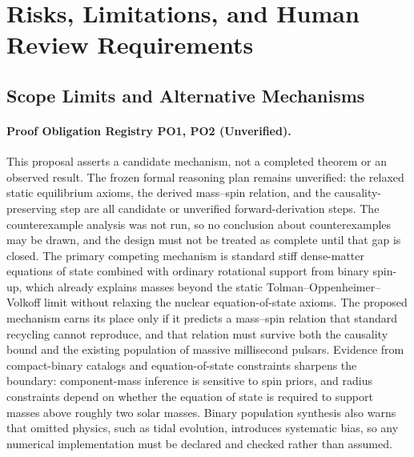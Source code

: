 \documentclass[conference]{IEEEtran}
\begin{document}
\section{Risks, Limitations, and Human Review Requirements}
\subsection{Scope Limits and Alternative Mechanisms}
\paragraph{Proof Obligation Registry PO1, PO2 (Unverified).} This proposal asserts a candidate mechanism, not a completed theorem or an observed result. The frozen formal reasoning plan remains unverified: the relaxed static equilibrium axioms, the derived mass--spin relation, and the causality-preserving step are all candidate or unverified forward-derivation steps. The counterexample analysis was not run, so no conclusion about counterexamples may be drawn, and the design must not be treated as complete until that gap is closed. The primary competing mechanism is standard stiff dense-matter equations of state combined with ordinary rotational support from binary spin-up, which already explains masses beyond the static Tolman--Oppenheimer--Volkoff limit without relaxing the nuclear equation-of-state axioms. The proposed mechanism earns its place only if it predicts a mass--spin relation that standard recycling cannot reproduce, and that relation must survive both the causality bound and the existing population of massive millisecond pulsars. Evidence from compact-binary catalogs and equation-of-state constraints sharpens the boundary: component-mass inference is sensitive to spin priors, and radius constraints depend on whether the equation of state is required to support masses above roughly two solar masses. Binary population synthesis also warns that omitted physics, such as tidal evolution, introduces systematic bias, so any numerical implementation must be declared and checked rather than assumed.~\cite{cite_3d2e6757608d5364,cite_42e341ff6471ce89,cite_81b31d0d8218f9b8}
\end{document}
